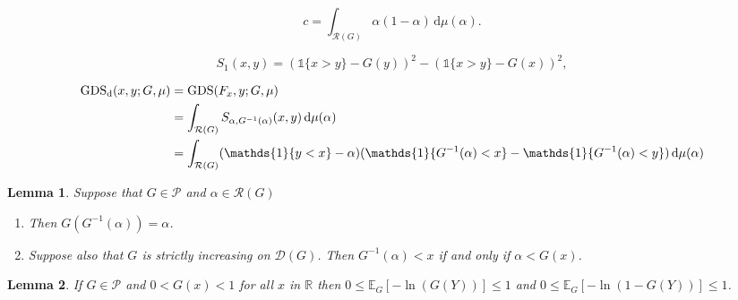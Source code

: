 \documentclass[10pt,a4paper]{amsart}
\newtheorem{lem}{Lemma}
\newcommand{\EEE}{\mathbb{E}}
\newcommand{\GDS}{\mathrm{GDS}}
\newcommand{\GDSd}{\mathrm{GDS}_\mathrm{d}}
\newcommand{\RG}{\mathcal{R}(G)}
\newcommand{\RRR}{\mathbb{R}}
\newcommand{\dd}{\mathrm{d}}
\newcommand{\one}{\mathds{1}}
\begin{document}
\begin{equation}
c=\int_{\RG}\alpha(1-\alpha)\,\dd\mu(\alpha).
\end{equation}

\begin{equation}\label{eq:S1}
S_1(x,y)= (\one\{x>y\}-G(y))^2 - (\one\{x>y\}-G(x))^2,
\end{equation}

\begin{align}
\GDSd(x,y;G,\mu)
&= \GDS(F_x,y;G,\mu) \notag\\
&= \int_{\RG} S_{\alpha,G^{-1}(\alpha)}(x,y)\,\dd\mu(\alpha) \notag \\
&=  \int_{\RG}  (\one\{y<x\} - \alpha)(\one\{G^{-1}(\alpha) < x\} - \one\{G^{-1}(\alpha) < y\}) \,\dd\mu(\alpha) \label{eq:deterministic GDS}
\end{align}

\begin{lem}\label{lem:alpha in RG}
Suppose that $G\in\mathcal{P}$ and $\alpha\in\RG$
\begin{enumerate}
\item[(i)] Then $G(G^{-1}(\alpha))=\alpha$.
\item[(ii)] Suppose also that $G$ is strictly increasing on $\mathcal{D}(G)$. Then $G^{-1}(\alpha) < x$ if and only if $\alpha < G(x)$.
\end{enumerate}
\end{lem}

\begin{lem}\label{lem:finite expectations}
If $G\in\mathcal{P}$ and $0<G(x)<1$ for all $x$ in $\RRR$ then $0\leq \EEE_G[-\ln(G(Y))]\leq 1$ and $0\leq\EEE_G[-\ln(1-G(Y))]\leq 1$.
\end{lem}
\end{document}
